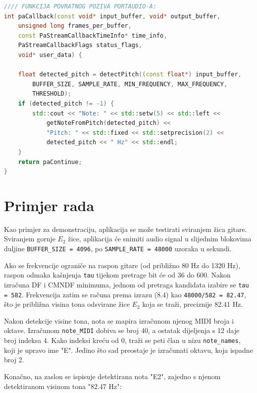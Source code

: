 \documentclass[times, utf8, diplomski, numeric]{fer}
\begin{document}
\begin{lstlisting}[language=C++, frame=single]
//// FUNKCIJA POVRATNOG POZIVA PORTAUDIO-A:
int paCallback(const void* input_buffer, void* output_buffer,
	unsigned long frames_per_buffer,
	const PaStreamCallbackTimeInfo* time_info,
	PaStreamCallbackFlags status_flags,
	void* user_data) {
	
	float detected_pitch = detectPitch((const float*) input_buffer,
		BUFFER_SIZE, SAMPLE_RATE, MIN_FREQUENCY, MAX_FREQUENCY,
		THRESHOLD);
	if (detected_pitch != -1) {
		std::cout << "Note: " << std::setw(5) << std::left <<
			getNoteFromPitch(detected_pitch) <<
			"Pitch: " << std::fixed << std::setprecision(2) <<
			detected_pitch << " Hz" << std::endl;
	}
	return paContinue;
}
\end{lstlisting}

\section{Primjer rada}
%
Kao primjer za demonstraciju, aplikacija se može testirati sviranjem žica gitare. Sviranjem gornje $E_2$ žice, aplikacija će snimiti audio signal u slijednim blokovima duljine \lstinline[basicstyle=\ttfamily]|BUFFER_SIZE = 4096|, po \lstinline[basicstyle=\ttfamily]|SAMPLE_RATE = 48000| uzoraka u sekundi.

Ako se frekvencije ograniče na raspon gitare (od približno 80 Hz do 1320 Hz), raspon odmaka kašnjenja \lstinline[basicstyle=\ttfamily]|tau| tijekom pretrage bit će od 36 do 600. Nakon izračuna DF i CMNDF minimuma, jednom od pretraga kandidata izabire se \lstinline[basicstyle=\ttfamily]|tau = 582|. Frekvencija zatim se računa prema izrazu (8.4) kao \lstinline[basicstyle=\ttfamily]|48000/582 = 82.47|, što je približna visina tona odsvirane žice $E_2$ koja se traži, preciznije 82.41 Hz.

Nakon detekcije visine tona, nota se mapira izračunom njenog MIDI broja i oktave. Izračunom \lstinline[basicstyle=\ttfamily]|note_MIDI| dobiva se broj 40, a ostatak dijeljenja s 12 daje broj indeksa 4. Kako indeksi kreću od 0, traži se peti član u nizu \lstinline[basicstyle=\ttfamily]|note_names|, koji je upravo ime "E". Jedino što sad preostaje je izračunati oktavu, koja ispadne broj 2.

Konačno, na zaslon se ispisuje detektirana nota "E2", zajedno s njenom detektiranom visinom tona "82.47 Hz":
\end{document}
